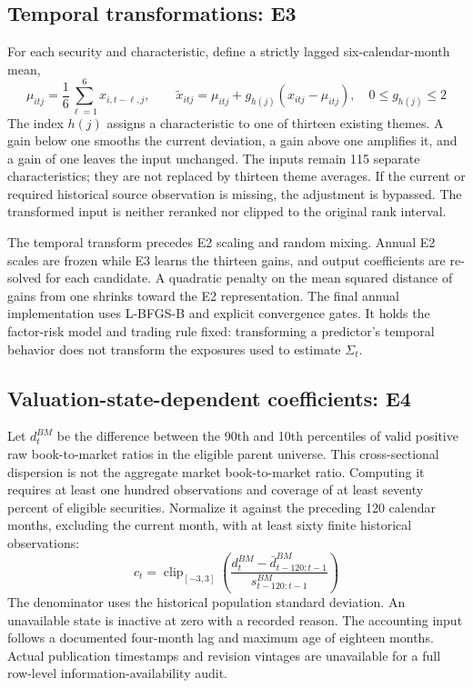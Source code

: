 \documentclass[12pt,letterpaper,fleqn]{article}
\begin{document}
\subsection{Temporal transformations: E3}
For each security and characteristic, define a strictly lagged six-calendar-month mean,
\begin{equation}\label{eq:temporal}
 \mu_{itj}=\frac16\sum_{\ell=1}^{6}x_{i,t-\ell,j},\qquad
 \widetilde x_{itj}=\mu_{itj}+g_{h(j)}(x_{itj}-\mu_{itj}),\quad
             0\leq g_{h(j)}\leq2
\end{equation}
The index $h(j)$ assigns a characteristic to one of thirteen existing themes. A gain below one smooths the current deviation, a gain above one amplifies it, and a gain of one leaves the input unchanged. The inputs remain 115 separate characteristics; they are not replaced by thirteen theme averages. If the current or required historical source observation is missing, the adjustment is bypassed. The transformed input is neither reranked nor clipped to the original rank interval.

The temporal transform precedes E2 scaling and random mixing. Annual E2 scales are frozen while E3 learns the thirteen gains, and output coefficients are re-solved for each candidate. A quadratic penalty on the mean squared distance of gains from one shrinks toward the E2 representation. The final annual implementation uses L-BFGS-B and explicit convergence gates. It holds the factor-risk model and trading rule fixed: transforming a predictor's temporal behavior does not transform the exposures used to estimate $\Sigma_t$.

\subsection{Valuation-state-dependent coefficients: E4}
Let $d_t^{BM}$ be the difference between the 90th and 10th percentiles of valid positive raw book-to-market ratios in the eligible parent universe. This cross-sectional dispersion is not the aggregate market book-to-market ratio. Computing it requires at least one hundred observations and coverage of at least seventy percent of eligible securities. Normalize it against the preceding 120 calendar months, excluding the current month, with at least sixty finite historical observations:
\begin{equation}\label{eq:state}
 c_t=\operatorname{clip}_{[-3,3]}
 \left(\frac{d_t^{BM}-\bar d^{BM}_{t-120:t-1}}
 {s^{BM}_{t-120:t-1}}\right)
\end{equation}
The denominator uses the historical population standard deviation. An unavailable state is inactive at zero with a recorded reason. The accounting input follows a documented four-month lag and maximum age of eighteen months. Actual publication timestamps and revision vintages are unavailable for a full row-level information-availability audit.
\end{document}
